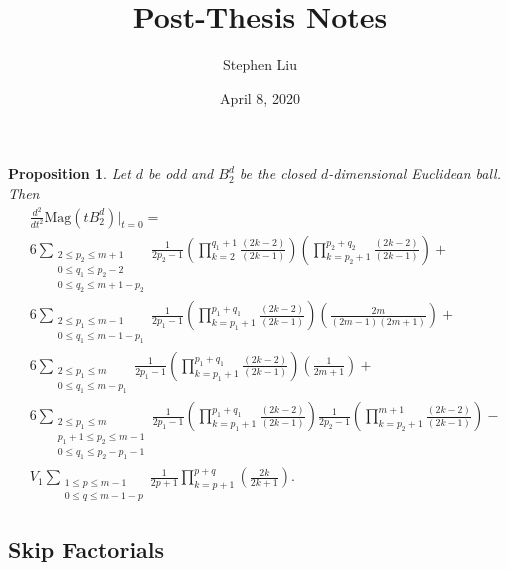 \documentclass[11pt]{article}
\theoremstyle{definition}
\theoremstyle{definition}
\theoremstyle{plain}
\theoremstyle{plain}
\newtheorem{prop}{Proposition}
\theoremstyle{plain}
\theoremstyle{definition}
\theoremstyle{definition}
\begin{document}
\author{Stephen Liu}
\title{Post-Thesis Notes}
\date{April 8, 2020}

\maketitle

\begin{prop}\label{prop:partialres}
Let $d$ be odd and $B_2^d$ be the closed $d$-dimensional Euclidean ball. Then
\begin{equation}\label{eqn:partialres}
\begin{aligned}
&\frac{d^2}{dt^2}\text{Mag}(tB_2^d)\big\vert_{t=0} = \\
&6\sum\limits_{\substack{2\leq p_2\leq m+1 \\ 0\leq q_1 \leq p_2-2 \\ 0\leq q_2 \leq m+1-p_2}}\frac{1}{2p_2-1}\left(\prod\limits_{k=2}^{q_1+1}\frac{(2k-2)}{(2k-1)}\right)\left(\prod\limits_{k=p_2+1}^{p_2+q_2}\frac{(2k-2)}{(2k-1)}\right) + \\
&6\sum\limits_{\substack{2\leq p_1\leq m-1 \\ 0\leq q_1\leq m-1-p_1}}\frac{1}{2p_1-1}\left(\prod\limits_{k=p_1+1}^{p_1+q_1}\frac{(2k-2)}{(2k-1)}\right)\left(\frac{2m}{(2m-1)(2m+1)}\right) + \\
&6\sum\limits_{\substack{2\leq p_1\leq m \\ 0\leq q_1\leq m-p_1}}\frac{1}{2p_1-1}\left(\prod\limits_{k=p_1+1}^{p_1+q_1}\frac{(2k-2)}{(2k-1)}\right)\left(\frac{1}{2m+1}\right) + \\
&6\sum\limits_{\substack{2\leq p_1\leq m \\ p_1+1\leq p_2 \leq m-1 \\ 0\leq q_1\leq p_2-p_1-1 }}\frac{1}{2p_1-1}\left(\prod\limits_{k=p_1+1}^{p_1+q_1}\frac{(2k-2)}{(2k-1)}\right)\frac{1}{2p_2-1}\left(\prod\limits_{k=p_2+1}^{m+1}\frac{(2k-2)}{(2k-1)}\right) - \\
&V_{1}\sum\limits_{\substack{1\leq p \leq m-1 \\ 0 \leq q \leq m - 1 - p}}\frac{1}{2p+1}\prod\limits_{k=p+1}^{p+q}\left(\frac{2k}{2k+1}\right).
\end{aligned}
\end{equation}
\end{prop}

\subsection*{Skip Factorials}
\end{document}
